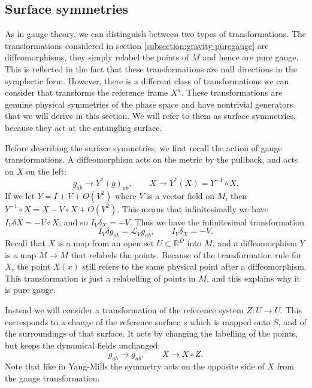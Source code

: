 \documentclass[a4paper,11pt]{article}
\newcommand{\R}{\mathbb{R}}
\begin{document}
\subsection{Surface symmetries}

As in gauge theory, we can distinguish between two types of transformations.
The transformations considered in section \ref{subsection:gravity-puregauge} are diffeomorphisms, they simply relabel the points of $M$ and hence are pure gauge.
This is reflected in the fact that these transformations are null directions in the symplectic form.
However, there is a different class of transformations we can consider that transforms the reference frame $X^a$.
These transformations are genuine physical symmetries of the phase space and have nontrivial generators that we will derive in this section.
We will refer to them as surface symmetries, because they act at the entangling surface.

Before describing the surface symmetries, we first recall the action of gauge transformations.
A diffeomorphism acts on the metric by the pullback, and acts on $X$ on the left:
\begin{equation}
g_{ab} \to Y^*(g)_{ab}, \qquad X \to Y^*(X) = Y^{-1} \circ X.
\end{equation}
If we let $Y = I + V + O(V^2)$ where $V$ is a vector field on $M$, then $Y^{-1} \circ X = X - V \circ X + O(V^2)$. This means that infinitesimally we have  $I_V \delta X = -V \circ X$, and so $I_V \delta_X = -V$.
Thus we have the infinitesimal transformation 
\begin{equation}
I_V \delta g_{ab} = \mathcal{L}_V g_{ab}, \qquad I_V \delta_X = -V.
\end{equation}
Recall that $X$ is a map from an open set $U \subset \R^D$ into $M$, and a diffeomorphism $Y$ is a map $M \to M$ that relabels the points.
Because of the transformation rule for $X$, the point $X(x)$ still refers to the same physical point after a diffeomorphism.
This transformation is just a relabelling of points in $M$, and this explains why it is pure gauge.

Instead we will consider a transformation of the reference system $Z : U \to U$.
This corresponds to a change of the reference surface $s$ which is mapped onto $S$, and of the surroundings of that surface.
It acts by changing the labelling of the points, but keeps the dynamical fields unchanged:
\begin{equation}
g_{ab} \to g_{ab}, \qquad X \to X \circ Z.
\end{equation}
Note that like in Yang-Mills the symmetry acts on the opposite side of $X$ from the gauge transformation.
\end{document}
